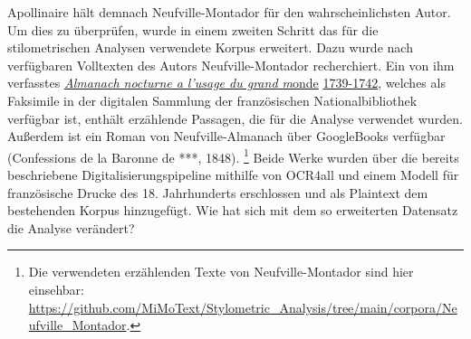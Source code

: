 \documentclass[
  12pt,
  letterpaper,
]{classicthesis}
\begin{document}
Apollinaire hält demnach Neufville-Montador für den wahrscheinlichsten
Autor. Um dies zu überprüfen, wurde in einem zweiten Schritt das für die
stilometrischen Analysen verwendete Korpus erweitert. Dazu wurde nach
verfügbaren Volltexten des Autors Neufville-Montador recherchiert. Ein
von ihm verfasstes
\href{https://gallica.bnf.fr/services/engine/search/sru?operation=searchRetrieve&version=1.2&collapsing=disabled&query=\%28gallica\%20all\%20\%22neufville-montador\%22\%29\%20and\%20arkPress\%20all\%20\%22cb46635638h_date\%22&rk=64378;0}{\emph{Almanach
nocturne a l'usage du grand m}onde}
\href{https://gallica.bnf.fr/services/engine/search/sru?operation=searchRetrieve&version=1.2&collapsing=disabled&query=\%28gallica\%20all\%20\%22neufville-montador\%22\%29\%20and\%20arkPress\%20all\%20\%22cb46635638h_date\%22&rk=64378;0}{1739-1742},
welches als Faksimile in der digitalen Sammlung der französischen
Nationalbibliothek verfügbar ist, enthält erzählende Passagen, die für
die Analyse verwendet wurden. Außerdem ist ein Roman von
Neufville-Almanach über GoogleBooks verfügbar (Confessions de la Baronne
de ***, 1848). \footnote{Die verwendeten erzählenden Texte von
  Neufville-Montador sind hier einsehbar:
  \url{https://github.com/MiMoText/Stylometric_Analysis/tree/main/corpora/Neufville_Montador}.}
Beide Werke wurden über die bereits beschriebene
Digitalisierungspipeline mithilfe von OCR4all und einem Modell für
französische Drucke des 18. Jahrhunderts erschlossen und als Plaintext
dem bestehenden Korpus hinzugefügt. Wie hat sich mit dem so erweiterten
Datensatz die Analyse verändert?
\end{document}
